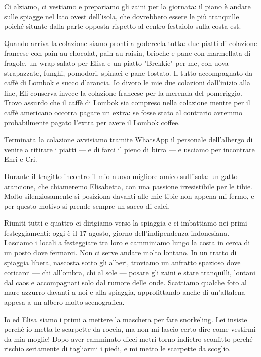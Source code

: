 Ci alziamo, ci vestiamo e prepariamo gli zaini per la giornata: il piano è andare sulle spiagge nel lato ovest dell'isola, che dovrebbero essere le più tranquille poiché situate dalla parte opposta rispetto al centro festaiolo sulla costa est.

Quando arriva la colazione siamo pronti a godercela tutta: due piatti di colazione francese con pain au chocolat, pain au raisin, brioche e pane con marmellata di fragole, un wrap salato per Elisa e un piatto "Brekkie" per me, con uova strapazzate, funghi, pomodori, spinaci e pane tostato. Il tutto accompagnato da caffè di Lombok e succo d'arancia. Io divoro le mie due colazioni dall'inizio alla fine, Eli conserva invece la colazione francese per la merenda del pomeriggio. Trovo assurdo che il caffè di Lombok sia compreso nella colazione mentre per il caffè americano occorra pagare un extra: se fosse stato al contrario avremmo probabilmente pagato l'extra per avere il Lombok coffee.

Terminata la colazione avvisiamo tramite WhatsApp il personale dell'albergo di venire a ritirare i piatti — e di farci il pieno di birra — e usciamo per incontrare Enri e Cri.

Durante il tragitto incontro il mio nuovo migliore amico sull'isola: un gatto arancione, che chiameremo Elisabetta, con una passione irresistibile per le tibie. Molto silenziosamente si posiziona davanti alle mie tibie non appena mi fermo, e per questo motivo si prende sempre un sacco di calci.

Riuniti tutti e quattro ci dirigiamo verso la spiaggia e ci imbattiamo nei primi festeggiamenti: oggi è il 17 agosto, giorno dell'indipendenza indonesiana. Lasciamo i locali a festeggiare tra loro e camminiamo lungo la costa in cerca di un posto dove fermarci. Non ci serve andare molto lontano. In un tratto di spiaggia libera, nascosta sotto gli alberi, troviamo un anfratto spazioso dove coricarci — chi all'ombra, chi al sole — posare gli zaini e stare tranquilli, lontani dal caos e accompagnati solo dal rumore delle onde. Scattiamo qualche foto al mare azzurro davanti a noi e alla spiaggia, approfittando anche di un'altalena appesa a un albero molto scenografica.

Io ed Elisa siamo i primi a mettere la maschera per fare snorkeling. Lei insiste perché io metta le scarpette da roccia, ma non mi lascio certo dire come vestirmi da mia moglie! Dopo aver camminato dieci metri torno indietro sconfitto perché rischio seriamente di tagliarmi i piedi, e mi metto le scarpette da scoglio.

